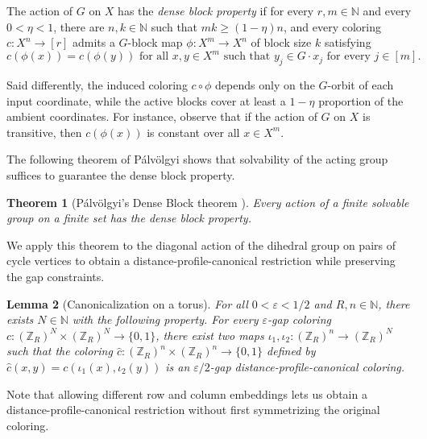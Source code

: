 \documentclass[11pt]{article}
\newtheorem{theorem}{Theorem}
\newtheorem{lemma}[theorem]{Lemma}
\theoremstyle{remark}
\begin{document}
The action of $G$ on $X$ has the \emph{dense block property} if for every $r, m \in \mathbb{N}$ and every $0 < \eta < 1$, there are $n, k \in \mathbb{N}$ such that $mk \geq (1 - \eta)n$, and every coloring $c : X^n \to [r]$ admits a $G$-block map $\phi : X^m \to X^n$ of block size $k$ satisfying \[c(\phi(x)) = c(\phi(y)) \text{ for all $x, y \in X^m$ such that $y_j \in G \cdot x_j$ for every $j \in [m]$.}\]

Said differently, the induced coloring $c\circ\phi$ depends only on the $G$-orbit of each input coordinate, while the active blocks cover at least a $1-\eta$ proportion of the ambient coordinates.
For instance, observe that if the action of $G$ on $X$ is transitive, then $c(\phi(x))$ is constant over all $x \in X^m$.

The following theorem of Pálvölgyi shows that solvability of the acting group suffices to guarantee the dense block property.

\begin{theorem}[Pálvölgyi’s Dense Block theorem {\cite[Theorem 11]{Palvolgyi26}}]\label{lem:palvolgyi}
    Every action of a finite solvable group on a finite set has the dense block property.
\end{theorem}

We apply this theorem to the diagonal action of the dihedral group on pairs of cycle vertices to obtain a distance-profile-canonical restriction while preserving the gap constraints.

\begin{lemma}[Canonicalization on a torus]\label{lem:make-nice}
    For all $0 < \varepsilon < 1/2$ and $R, n \in \mathbb{N}$, there exists $N \in \mathbb{N}$ with the following property.
    For every $\varepsilon$-gap coloring $c : (\mathbb{Z}_R)^N \times (\mathbb{Z}_R)^N \to \{0, 1\}$, there exist two maps $\iota_1, \iota_2 : (\mathbb{Z}_R)^n \to (\mathbb{Z}_R)^N$ such that the coloring $\widehat{c} : (\mathbb{Z}_{R})^n \times (\mathbb{Z}_{R})^n \to \{0, 1\}$ defined by $\widehat{c}(x, y) = c(\iota_1(x), \iota_2(y))$ is an $\varepsilon/2$-gap distance-profile-canonical coloring.  
\end{lemma}

Note that allowing different row and column embeddings lets us obtain a distance-profile-canonical restriction without first symmetrizing the original coloring.
\end{document}
